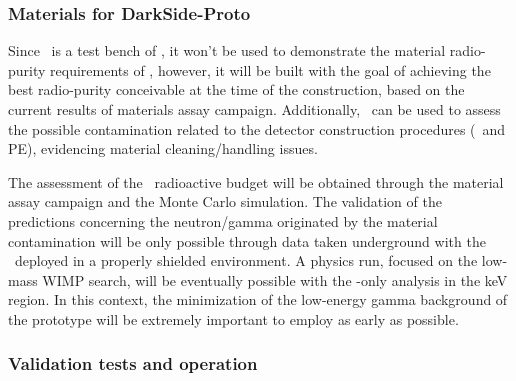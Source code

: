 \subsubsection{Materials for DarkSide-Proto}

Since \DSps\ is a test bench of \DSks, it won't be used to demonstrate the material radio-purity requirements of \DSks, however, it will be built with the goal of achieving the best radio-purity conceivable at the time of the construction, based on the current results of materials assay campaign. Additionally, \DSps\ can be used to assess the possible contamination related to the detector construction procedures (\TPC\ and PE), evidencing material cleaning/handling issues.

The assessment of the \DSps\ radioactive budget will be obtained through the material assay campaign and the Monte Carlo simulation. The validation of the predictions concerning the neutron/gamma originated by the material contamination will be only possible through data taken underground with the \DSps\ deployed in a properly shielded environment. A physics run, focused on the low-mass WIMP search, will be eventually possible with the \STwo-only analysis in the keV region. In this context, the minimization of the low-energy gamma background of the prototype will be extremely important to employ as early as possible.


\subsubsection{Validation tests and operation}

